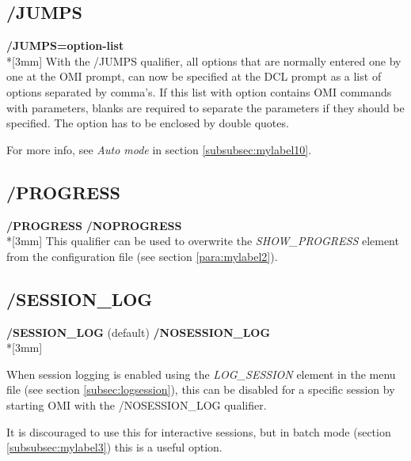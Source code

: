 \documentclass[a4paper]{book}
\newcommand{\vs}{\vspace{3mm}}
\renewcommand{\indent}{\hspace*{5mm}}
\begin{document}
\subsection{/JUMPS}
\label{subsubsec:mylabel5}

\vs

\indent\textbf{/JUMPS=option-list}\\*[3mm]
With the \textsf{/JUMPS} qualifier, all options that are normally entered one by one 
at the OMI prompt, can now be specified at the DCL prompt as a list of 
options separated by comma's. If this list with option contains OMI commands 
with parameters, blanks are required to separate the parameters if they 
should be specified. The option has to be enclosed by double quotes.

\vs

For more info, see \textit{Auto mode} in section \ref{subsubsec:mylabel10}.

\subsection{/PROGRESS}
\label{subsubsec:mylabel6}

\vs

\indent\textbf{/PROGRESS} \newline
\indent\textbf{/NOPROGRESS}\\*[3mm]
This qualifier can be used to overwrite the \textsl{SHOW{\_}PROGRESS} element from 
the configuration file (see section \ref{para:mylabel2}).

\subsection{/SESSION{\_}LOG}
\label{subsubsec:sessionlog}

\vs

\indent\textbf{/SESSION{\_}LOG} (default) \newline
\indent\textbf{/NOSESSION{\_}LOG}\\*[3mm]

When session logging is enabled using the \textsl{LOG{\_}SESSION} element in the menu file (see section \ref{subsec:logsession}), this can be disabled for a specific session by starting OMI with the \textsf{/NOSESSION{\_}LOG} qualifier.

It is discouraged to use this for interactive sessions, but in batch mode (section \ref{subsubsec:mylabel3}) this is a useful option.
\end{document}
